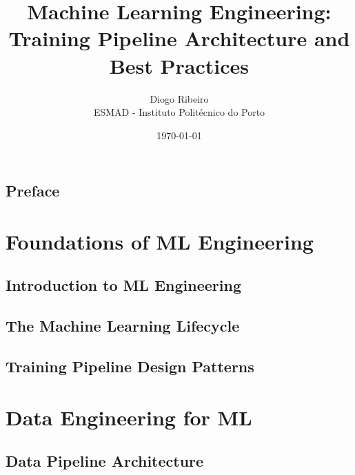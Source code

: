 \documentclass[12pt,a4paper]{book}
\title{Machine Learning Engineering:\\Training Pipeline Architecture and Best Practices}
\author{Diogo Ribeiro\\
        ESMAD - Instituto Politécnico do Porto}
\date{\today}
\theoremstyle{definition}
\theoremstyle{plain}
\theoremstyle{remark}
\begin{document}
\frontmatter
\maketitle

\tableofcontents
\listoffigures
\listoftables
\listofalgorithms

\chapter{Preface}




\mainmatter

\part{Foundations of ML Engineering}

\chapter{Introduction to ML Engineering}
\label{ch:introduction}


\chapter{The Machine Learning Lifecycle}
\label{ch:ml_lifecycle}


\chapter{Training Pipeline Design Patterns}
\label{ch:training_pipelines}


\part{Data Engineering for ML}

\chapter{Data Pipeline Architecture}
\label{ch:data_pipelines}

\end{document}
